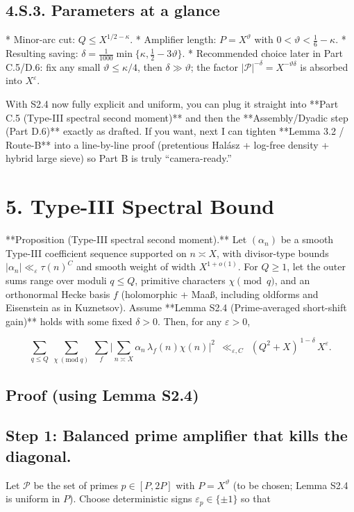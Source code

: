 \documentclass[11pt]{article}
\theoremstyle{definition}
\theoremstyle{remark}
\begin{document}
\subsection*{4.S.3. Parameters at a glance}

* Minor-arc cut: $Q\le X^{1/2-\kappa}$.
* Amplifier length: $P=X^\vartheta$ with $0<\vartheta<\tfrac16-\kappa$.
* Resulting saving: $\delta=\frac1{1000}\min\{\kappa,\tfrac12-3\vartheta\}$.
* Recommended choice later in Part C.5/D.6: fix any small $\vartheta\le \kappa/4$, then $\delta\gg\vartheta$; the factor $|\mathcal P|^{-\delta}=X^{-\vartheta\delta}$ is absorbed into $X^\varepsilon$.

With S2.4 now fully explicit and uniform, you can plug it straight into **Part C.5 (Type-III spectral second moment)** and then the **Assembly/Dyadic step (Part D.6)** exactly as drafted. If you want, next I can tighten **Lemma 3.2 / Route-B** into a line-by-line proof (pretentious Halász + log-free density + hybrid large sieve) so Part B is truly “camera-ready.”


\section*{5. Type-III Spectral Bound}

**Proposition (Type-III spectral second moment).**
Let $(\alpha_n)$ be a smooth Type-III coefficient sequence supported on $n\asymp X$, with divisor-type bounds $|\alpha_n|\ll_\varepsilon \tau(n)^C$ and smooth weight of width $X^{1+o(1)}$. For $Q\ge 1$, let the outer sums range over moduli $q\le Q$, primitive characters $\chi\pmod q$, and an orthonormal Hecke basis $f$ (holomorphic + Maaß, including oldforms and Eisenstein as in Kuznetsov). Assume **Lemma S2.4 (Prime-averaged short-shift gain)** holds with some fixed $\delta>0$. Then, for any $\varepsilon>0$,

$$
\sum_{q\le Q}\ \sum_{\chi\ (\mathrm{mod}\ q)}\ \sum_{f}
\Bigg|\sum_{n\asymp X}\alpha_n\,\lambda_f(n)\chi(n)\Bigg|^2
\ \ \ll_{\varepsilon,C}\ \ (Q^2+X)^{\,1-\delta}\,X^{\varepsilon}.
$$

\subsection*{Proof (using Lemma S2.4)}

\subsection*{Step 1: Balanced prime amplifier that kills the diagonal.}
Let $\mathcal P$ be the set of primes $p\in[P,2P]$ with $P=X^\vartheta$ (to be chosen; Lemma S2.4 is uniform in $P$).
Choose deterministic signs $\varepsilon_p\in\{\pm 1\}$ so that
\end{document}
